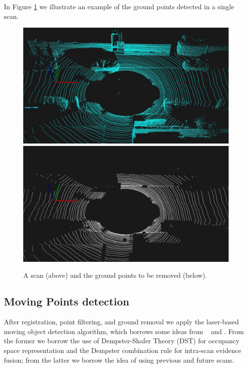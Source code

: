 In Figure \ref{fig:groundremoval} we illustrate an example of the ground points detected in a single scan.



\begin{figure}
\setlength{\tabcolsep}{1pt}
\begin{center}
\includegraphics[width=0.99\columnwidth]{./img/ch-laser/beforeGroundRemoval} \\
\vspace{0.3cm}
\includegraphics[width=0.99\columnwidth]{./img/ch-laser/postGroundRemoval}
\end{center}
\caption{A scan (above) and the ground points to be removed (below).}
\label{fig:groundremoval}
\end{figure}

\subsection{Moving Points detection}
After registration, point filtering, and ground removal we apply the laser-based moving object detection algorithm, which borrows some ideas from ~\cite{xiao2013change} and \cite{vallet2015extracting}. From the former we borrow the use of Dempster-Shafer Theory (DST) for occupancy space representation and the Dempster combination rule for intra-scan evidence fusion; from the latter we borrow the idea of using previous and future scans.

